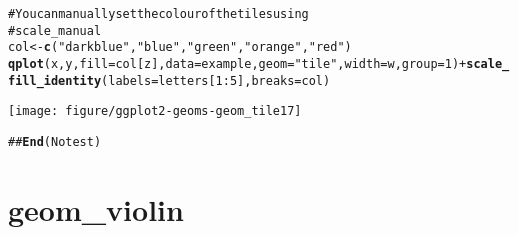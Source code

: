 \documentclass[a4paper,titlepage]{tufte-handout}\usepackage{graphicx, color}
\makeatletter
\def\maxwidth{ %
  \ifdim\Gin@nat@width>\linewidth
    \linewidth
  \else
    \Gin@nat@width
  \fi
}
\newcommand{\hlfunctioncall}[1]{\textcolor[rgb]{0.501960784313725,0,0.329411764705882}{\textbf{#1}}}%
\newcommand{\hlstring}[1]{\textcolor[rgb]{0.6,0.6,1}{#1}}%
\newcommand{\hlcomment}[1]{\textcolor[rgb]{0.180392156862745,0.6,0.341176470588235}{#1}}%
\newenvironment{kframe}{%
 \def\at@end@of@kframe{}%
 \ifinner\ifhmode%
  \def\at@end@of@kframe{\end{minipage}}%
  \begin{minipage}{\columnwidth}%
 \fi\fi%
 \def\FrameCommand##1{\hskip\@totalleftmargin \hskip-\fboxsep
 \colorbox{shadecolor}{##1}\hskip-\fboxsep
     \hskip-\linewidth \hskip-\@totalleftmargin \hskip\columnwidth}%
 \MakeFramed {\advance\hsize-\width
   \@totalleftmargin\z@ \linewidth\hsize
   \@setminipage}}%
 {\par\unskip\endMakeFramed%
 \at@end@of@kframe}
\newenvironment{knitrout}{}{} %
\makeatother
\begin{document}
\begin{knitrout}
\begin{kframe}
\begin{alltt}
\hlcomment{# You can manually set the colour of the tiles using}
\hlcomment{# scale_manual}
col <- \hlfunctioncall{c}(\hlstring{"darkblue"}, \hlstring{"blue"}, \hlstring{"green"}, \hlstring{"orange"}, \hlstring{"red"})
\hlfunctioncall{qplot}(x, y, fill=col[z], data=example, geom=\hlstring{"tile"}, width=w, group=1) + \hlfunctioncall{scale_fill_identity}(labels=letters[1:5], breaks=col)
\end{alltt}
\end{kframe}\texttt{[image: figure/ggplot2-geoms-geom\_tile17]} \begin{kframe}\begin{alltt}
\hlcomment{## \hlfunctioncall{End}(No test)}
\end{alltt}
\end{kframe}
\end{knitrout}


\section{geom\_violin}
\end{document}
